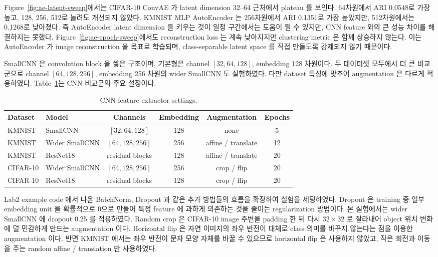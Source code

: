 \documentclass[11pt]{article}
\begin{document}
Figure~\ref{fig:ae-latent-sweep}에서는 CIFAR-10 ConvAE 가 latent dimension 32--64 근처에서 plateau 를 보인다.
64차원에서 ARI 0.0548로 가장 높고, 128, 256, 512로 늘려도 개선되지 않았다.
KMNIST MLP AutoEncoder 는 256차원에서 ARI 0.1351로 가장 높았지만, 512차원에서는 0.1268로 낮아졌다.
즉 AutoEncoder latent dimension 을 키우는 것이 일정 구간에서는 도움이 될 수 있지만, CNN feature 와의 큰 성능 차이를 해결하지는 못했다.
Figure~\ref{fig:ae-epoch-sweep}에서도 reconstruction loss 는 계속 낮아지지만 clustering metric 은 함께 상승하지 않는다.
이는 AutoEncoder 가 image reconstruction 을 목표로 학습되며, class-separable latent space 를 직접 만들도록 강제되지 않기 때문이다.

SmallCNN 은 convolution block 을 쌓은 구조이며, 기본형은 channel \([32,64,128]\), embedding 128 차원이다.
두 데이터셋 모두에서 더 큰 비교군으로 channel \([64,128,256]\), embedding 256 차원의 wider SmallCNN 도 실험하였다.
다만 dataset 특성에 맞추어 augmentation 은 다르게 적용하였다.
Table~\ref{tab:cnn-settings}는 CNN 비교군의 주요 설정이다.

\begin{table}[H]
    \centering
    \caption{CNN feature extractor settings.}
    \label{tab:cnn-settings}
    \begin{tabular}{llcccc}
        \toprule
        Dataset & Model & Channels & Embedding & Augmentation & Epochs\\
        \midrule
        KMNIST & SmallCNN & \([32,64,128]\) & 128 & none & 5\\
        KMNIST & Wider SmallCNN & \([64,128,256]\) & 256 & affine / translate & 12\\
        KMNIST & ResNet18 & residual blocks & 128 & affine / translate & 20\\
        CIFAR-10 & Wider SmallCNN & \([64,128,256]\) & 256 & crop / flip & 20\\
        CIFAR-10 & ResNet18 & residual blocks & 128 & crop / flip & 20\\
        \bottomrule
    \end{tabular}
\end{table}

Lab2 example code 에서 나온 BatchNorm, Dropout 과 같은 추가 방법들의 흐름을 확장하여 실험을 세팅하였다.
Dropout 은 training 중 일부 embedding unit 을 확률적으로 0으로 만들어 특정 feature 에 과하게 의존하는 것을 줄이는 regularization 방법이다.
본 실험에서는 wider SmallCNN 에 dropout 0.25 를 적용하였다.
Random crop 은 CIFAR-10 image 주변을 padding 한 뒤 다시 \(32\times32\) 로 잘라내어 object 위치 변화에 덜 민감하게 만드는 augmentation 이다.
Horizontal flip 은 자연 이미지의 좌우 반전이 대체로 class 의미를 바꾸지 않는다는 점을 이용한 augmentation 이다.
반면 KMNIST 에서는 좌우 반전이 문자 모양 자체를 바꿀 수 있으므로 horizontal flip 은 사용하지 않았고, 작은 회전과 이동을 주는 random affine / translation 만 사용하였다.
\end{document}
